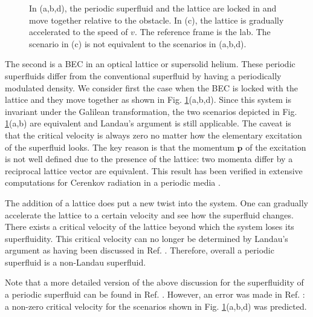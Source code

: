 \documentclass[doublecol]{epl2}
\begin{document}
\begin{figure}[!h]
\caption{In (a,b,d), the periodic superfluid and the lattice are locked in and move together relative
to the obstacle. In (c), the lattice is gradually accelerated to the speed of $v$.
The reference frame is the lab. The scenario in (c) is not equivalent to the scenarios in (a,b,d). }
\label{periodic}
\end{figure}

The second is a BEC in an optical lattice or supersolid helium. These periodic superfluids
differ from the conventional superfluid by having a periodically modulated density.
We consider first the case when the BEC is locked
with the lattice and they move together as shown in Fig. \ref{periodic}(a,b,d).
Since this system is invariant under the Galilean transformation, the two scenarios
depicted in Fig. \ref{periodic}(a,b) are equivalent and Landau's argument is still
applicable. The caveat is that the critical velocity is always zero no matter how
the elementary excitation of the superfluid looks. The key reason is that the
momentum $\mathbf p$ of the excitation is not well defined due to the presence
of the lattice: two momenta differ by a reciprocal lattice vector are
equivalent. This result has been verified in extensive
computations for Cerenkov radiation in a periodic media \cite{key2}.

The addition of a lattice does put a new twist into the system. One
can gradually accelerate the lattice to a certain velocity and see how the superfluid
changes. There exists a critical velocity of the lattice beyond which the system loses
its superfluidity. This critical velocity can no longer be determined by Landau's
argument as having been discussed in Ref. \cite{wushi}. Therefore, overall a periodic
superfluid is a non-Landau superfluid.

Note that a more detailed version of the above discussion for the superfluidity
of a periodic superfluid can be found in Ref. \cite{wushi}. However, an error was made
in Ref. \cite{wushi}: a non-zero critical velocity for the scenarios shown
in  Fig. \ref{periodic}(a,b,d) was predicted.
\end{document}

